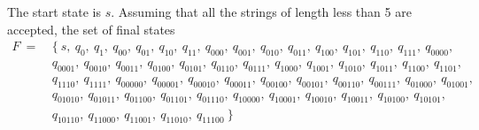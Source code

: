 \documentclass{article}
\begin{document}
    \quad The start state is $s$. Assuming that all the strings of length less than 5 are accepted, the set of final states
    \begin{equation}
    \begin{aligned}
    F~  = ~&\{\  s,~  q_{0},~  q_{1},~  q_{00},~  q_{01},~  q_{10},~
      q_{11},~  q_{000},~  q_{001},~  q_{010},~  q_{011},~  q_{100},~  q_{101},~  q_{110},~  q_{111},~  q_{0000},~ \\
      & q_{0001},~  q_{0010},~  q_{0011},~  q_{0100},~  q_{0101},~q_{0110},~  q_{0111},~  q_{1000},~  q_{1001},~  q_{1010},~  q_{1011},~  q_{1100},~  q_{1101},~ \\
      &  q_{1110},~  q_{1111},~  q_{00000},~  q_{00001},~  q_{00010},~  q_{00011},~q_{00100},~  q_{00101},~  q_{00110},~  q_{00111},~  q_{01000},~  q_{01001},~ \\
      & q_{01010},~  q_{01011},~   q_{01100},~  q_{01101},~  q_{01110},~  q_{10000},~  q_{10001},~q_{10010},~  q_{10011},~  q_{10100},~  q_{10101},~\\
      &  q_{10110},~  q_{11000},~  q_{11001},~ q_{11010},~  q_{11100}\ \} \nonumber
    \end{aligned}
    \end{equation}
    
\end{document}
